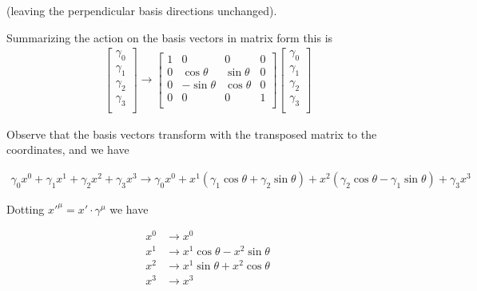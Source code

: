 (leaving the perpendicular basis directions unchanged).

Summarizing the action on the basis vectors in matrix form this is
\begin{align*}
\begin{bmatrix}
\gamma_0 \\
\gamma_1 \\
\gamma_2 \\
\gamma_3 \\
\end{bmatrix}
\rightarrow
\begin{bmatrix}
1 & 0 & 0 & 0 \\
0 & \cos\theta & \sin\theta & 0 \\
0 & -\sin\theta & \cos\theta & 0 \\
0 & 0 & 0 & 1 \\
\end{bmatrix}
\begin{bmatrix}
\gamma_0 \\
\gamma_1 \\
\gamma_2 \\
\gamma_3 \\
\end{bmatrix}
\end{align*}

Observe that the basis vectors transform with the transposed matrix to the coordinates, and we have

\begin{align*}
\gamma_0 x^0
+ \gamma_1 x^1
+ \gamma_2 x^2
+ \gamma_3 x^3 
\rightarrow
\gamma_0 x^0
+x^1 (\gamma_1 \cos\theta + \gamma_2 \sin\theta)
+x^2 (\gamma_2 \cos\theta - \gamma_1 \sin\theta)
+\gamma_3 x^3
\end{align*}

Dotting ${x'}^\mu = x' \cdot \gamma^\mu$ we have

\begin{align*}
x^0 &\rightarrow x^0 \\
x^1 &\rightarrow x^1 \cos\theta - x^2 \sin\theta \\
x^2 &\rightarrow x^1 \sin\theta +x^2 \cos\theta  \\
x^3 &\rightarrow x^3
\end{align*}

